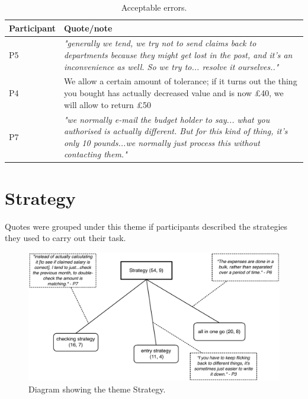 \begin{table}[htp]
\centering
    \begin{tabular}{ | l | p{10cm} |}
    \hline
     \textbf{Participant} & \textbf{Quote/note} \\ \hline
    P5 &  \textit{"generally we tend, we try not to send claims back to departments because they might get lost in the post, and it's an inconvenience as well. So we try to... resolve it ourselves.."} \\ \hline
    P4 & We allow a certain amount of tolerance; if it turns out the thing you bought has actually decreased value and is now  \pounds40, we will allow to return  \pounds50\\ \hline
    P7 & \textit{"we normally e-mail the budget holder to say... what you authorised is actually different. But for this kind of thing, it's only 10 pounds...we normally just process this without contacting them."} \\ \hline

    \hline
    \end{tabular}
    \caption[Study 1 acceptable errors quotes]{Acceptable errors.}
    \label{table:ch3_acceptableerrorsquotes}
\end{table}%

\clearpage
\section{Strategy}
Quotes were grouped under this theme if participants described the strategies they used to carry out their task.  

\begin{figure}[!ht]
\centering
\includegraphics[width=\textwidth]{images/ch12/Strategy.pdf}
\caption[Study 1 Strategy diagram]{Diagram showing the theme Strategy.}
\vspace{-9pt}
\label{fig:ch3_strategy}
\end{figure}

